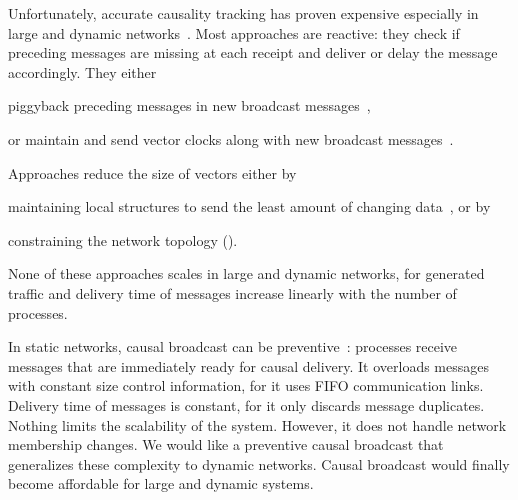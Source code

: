 Unfortunately, accurate causality tracking has proven expensive especially in
large and dynamic networks~\cite{charronbost1991concerning}. Most approaches are
reactive: they check if preceding messages are missing at each receipt and
deliver or delay the message accordingly. They either
\begin{inparaenum}[(i)]
\item piggyback preceding messages in new broadcast
  messages~\cite{birman1987reliable,hadzilacos1993fault},
\item or maintain and send vector clocks along with new broadcast
  messages~\cite{fidge1988timestamps,mattern1989virtual}.
\end{inparaenum}
Approaches reduce the size of vectors either by
\begin{inparaenum}[(a)]
\item maintaining local structures to send the least amount of changing
  data~\cite{singhal1992efficient}, or by
\item constraining the network topology (\REF).
\end{inparaenum}
None of these approaches scales in large and dynamic networks, for
generated traffic and delivery time of messages increase linearly with the
number of processes.

In static networks, causal broadcast can be
preventive~\cite{friedman2004causal}: processes receive messages that are
immediately ready for causal delivery. It overloads messages with constant size
control information, for it uses FIFO communication links. Delivery time of
messages is constant, for it only discards message duplicates. Nothing limits
the scalability of the system.
However, it does not handle network membership changes. We would like a
preventive causal broadcast that generalizes these complexity to dynamic
networks. Causal broadcast would finally become affordable for large and dynamic
systems.

